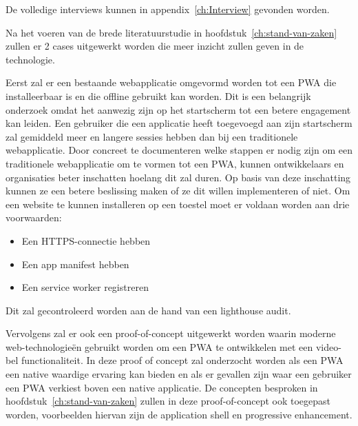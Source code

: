 De volledige interviews kunnen in appendix~\ref{ch:Interview} gevonden worden.

Na het voeren van de brede literatuurstudie in hoofdstuk~\ref{ch:stand-van-zaken} zullen er 2 cases uitgewerkt worden die meer inzicht zullen geven in de technologie.


Eerst zal er een bestaande webapplicatie omgevormd worden tot een PWA die installeerbaar is en die offline gebruikt kan worden.
Dit is een belangrijk onderzoek omdat het aanwezig zijn op het startscherm tot een betere engagement kan leiden. Een gebruiker die een applicatie heeft toegevoegd aan zijn startscherm zal gemiddeld meer en langere sessies hebben dan bij een traditionele webapplicatie.
\autocite{LePage2020b}
Door concreet te documenteren welke stappen er nodig zijn om een traditionele webapplicatie om te vormen tot een PWA, kunnen ontwikkelaars en organisaties beter inschatten hoelang dit zal duren.
Op basis van deze inschatting kunnen ze een betere beslissing maken of ze dit willen implementeren of niet.
Om een website te kunnen installeren op een toestel moet er voldaan worden aan drie voorwaarden:
\begin{itemize}
	\item Een HTTPS-connectie hebben
	\item Een app manifest hebben
	\item Een service worker registreren
\end{itemize}
Dit zal gecontroleerd worden aan de hand van een lighthouse audit.
	

Vervolgens zal er ook een proof-of-concept uitgewerkt worden waarin moderne web-technologieën gebruikt worden om een PWA te ontwikkelen met een video-bel functionaliteit. In deze proof of concept zal onderzocht worden als een PWA een native waardige ervaring kan bieden en als er gevallen zijn waar een gebruiker een PWA verkiest boven een native applicatie. De concepten besproken in hoofdstuk~\ref{ch:stand-van-zaken} zullen in deze proof-of-concept ook toegepast worden, voorbeelden hiervan zijn de application shell en  progressive enhancement.


